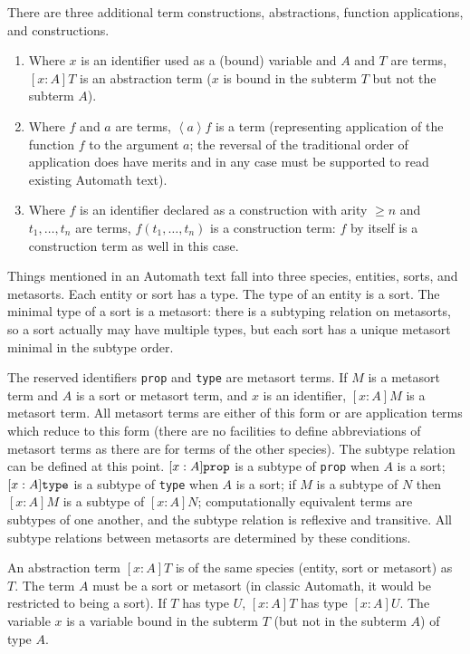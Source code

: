 \documentclass[12pt]{article}
\begin{document}
There are three additional term constructions, abstractions, function applications, and constructions.

\begin{enumerate}

\item Where $x$ is an identifier used as a (bound) variable and $A$ and $T$ are terms, $[x:A]T$ is an abstraction term ($x$ is bound in the subterm $T$ but not the subterm $A$).  

\item Where $f$ and $a$ are terms, $\left<a\right>f$ is a term (representing application of the function $f$ to the argument $a$;  the reversal of the traditional order of application does have merits and in any case must be supported to read existing Automath text).  

\item Where $f$ is an identifier declared as a construction with arity $\geq n$ and $t_1,\ldots,t_n$ are terms, $f(t_1,\ldots,t_n)$ is a construction term:  $f$ by itself is a construction term as well in this case.

\end{enumerate}

Things mentioned in an Automath text fall into three species, entities, sorts, and metasorts.  Each entity or sort has a type.  The type of an entity is a sort.  The minimal type of a sort is a metasort:  there is a subtyping relation on metasorts, so a sort actually may have multiple types, but each sort has a unique metasort minimal in the subtype order.

The reserved identifiers {\tt prop} and {\tt type} are metasort terms.  If $M$ is a metasort term and $A$ is a sort or metasort term, and $x$ is an identifier, $[x:A]M$ is a metasort term.
All metasort terms are either of this form or are application terms which reduce to this form  (there are no facilities to define abbreviations of metasort terms as there are for terms of the other species).  The subtype relation can be defined at this point.  $[x:A]{\tt prop}$ is a subtype of {\tt prop} when $A$ is a sort;  $[x:A]{\tt type}$ is a subtype of {\tt type} when $A$ is a sort; if $M$ is a subtype of $N$ then $[x:A]M$ is a subtype of $[x:A]N$; computationally equivalent terms are subtypes of one another, and the subtype relation is reflexive and transitive.  All subtype relations between metasorts are determined by these conditions.

An abstraction term $[x:A]T$ is of the same species (entity, sort or metasort) as $T$.  The term $A$ must be a sort or metasort (in classic Automath, it would be restricted to being a sort).  If $T$ has type $U$, $[x:A]T$ has type $[x:A]U$.  The variable $x$ is a variable bound in the subterm $T$ (but not in the subterm $A$) of type $A$.
\end{document}
